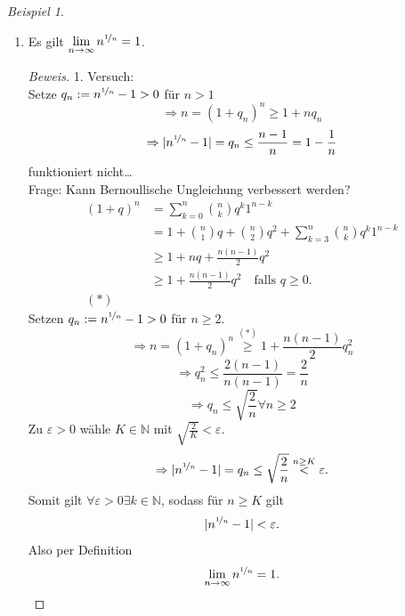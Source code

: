 \documentclass[12pt,a4paper,titlepage]{article} %
\theoremstyle{definition}
\theoremstyle{remark}
\newtheorem*{bsp}{Beispiel}
\newenvironment{bew}{\begin{proof}[Beweis]}{\end{proof}}
\newcommand{\N}{\mathbb{N}}
\begin{document}
\begin{bsp}
\begin{enumerate}
\begin{bew}
			$a_n = a^{\frac{1}{n}} = 1+q_n \Rightarrow a = (1+q_n)^n \underset{\text{Bern. Ungl.}}{\geq} 1+ nq_n$
			$$\Rightarrow 0 \leq q_n \leq \frac{a-1}{n} \forall n\in\N$$
			Zu $\varepsilon > 0$ wähle $K\in\N$ mit $K>\frac{a-1}{\varepsilon}$.\\
			Dann $n\geq K$
			$$|a_n-1| = |a^{\nicefrac{1}{n}}-1|= a^{\nicefrac{1}{n}} -1 = q_n \leq \frac{a-1}{n} < \varepsilon.$$
			Fall 3: $0<a<1$. Dann ist $b := \frac{1}{a}>1$.			
			$$\overset{\text{Fall 2}}{\Rightarrow} \lim\limits_{n\rightarrow\infty} b^{\frac{1}{n}} = 1$$
			\begin{align*}
				|a^{\nicefrac{1}{n}}-1|&=a^{\nicefrac{1}{n}}\left|1-\frac{a}{a^{\nicefrac{1}{n}}}\right|\\
				&= a^{\nicefrac{1}{n}}\left|1-\left(\frac{a}{a}\right)^{\nicefrac{1}{n}}\right|\\
				&= a^{\nicefrac{1}{n}} \left|1-b^{\nicefrac{1}{n}}\right|\\
				&\leq \left|1-b^{\nicefrac{1}{n}} \right|\underset{n\rightarrow\infty}{\longrightarrow} 0
			\end{align*}
			Somit gilt $$\lim\limits_{n\rightarrow\infty} a^{\nicefrac{1}{n}} = 1$$
		\end{bew}
	\item Es gilt $\lim\limits_{n\rightarrow\infty}n^{\nicefrac{1}{n}}=1$.
	\begin{bew}
		1. Versuch:\\
		Setze $q_n := n^{\nicefrac{1}{n}} -1>0$ für $n>1$\\
		$$\Rightarrow n=(1+q_n)^n \geq 1+nq_n$$
		$$\Rightarrow |n^{\nicefrac{1}{n}}-1| = q_n \leq \frac{n-1}{n} = 1-\frac{1}{n}$$
		funktioniert nicht\dots\\
		Frage: Kann Bernoullische Ungleichung verbessert werden?\\
		\begin{align*}
			(1+q)^n &= \sum_{k=0}^{n} \binom{n}{k} q^k1^{n-k}\\
			&=1+\binom{n}{1}q + \binom{n}{2}q^2 + \sum_{k=3}^{n}\binom{n}{k} q^k1^{n-k}\\
			&\geq 1+nq + \frac{n(n-1)}{2} q^2\\
			&\geq 1+\frac{n(n-1)}{2} q^2 \quad\text{falls }	q\geq 0.\\
			(*)
		\end{align*}
		Setzen $q_n := n^{\nicefrac{1}{n}} -1 >0$ für $n\geq 2$.
		$$\Rightarrow n = (1+q_n)^n \overset{(*)}{\geq}1+\frac{n(n-1)}{2} q_n^2$$
		$$\Rightarrow q_n^2 \leq \frac{2(n-1)}{n(n-1)} = \frac{2}{n}$$
		$$\Rightarrow q_n \leq \sqrt{\frac{2}{n}} \forall n\geq 2$$
		Zu $\varepsilon >0$ wähle $K\in\N$ mit $\sqrt{\frac{2}{K}}<\varepsilon$.
		$$\Rightarrow |n^{\nicefrac{1}{n}} -1| = q_n \leq \sqrt{\frac{2}{n}} \overset{n\geq K}{<} \varepsilon.$$
		Somit gilt $\forall\varepsilon>0\exists k\in\N$, sodass für $n\geq K$ gilt
		$$|n^{\nicefrac{1}{n}} - 1| <\varepsilon.$$
		Also per Definition
		$$\lim\limits_{n\rightarrow\infty} n^{\nicefrac{1}{n}} = 1.$$
	\end{bew}
	\end{enumerate}
\end{bsp}
\end{document}
